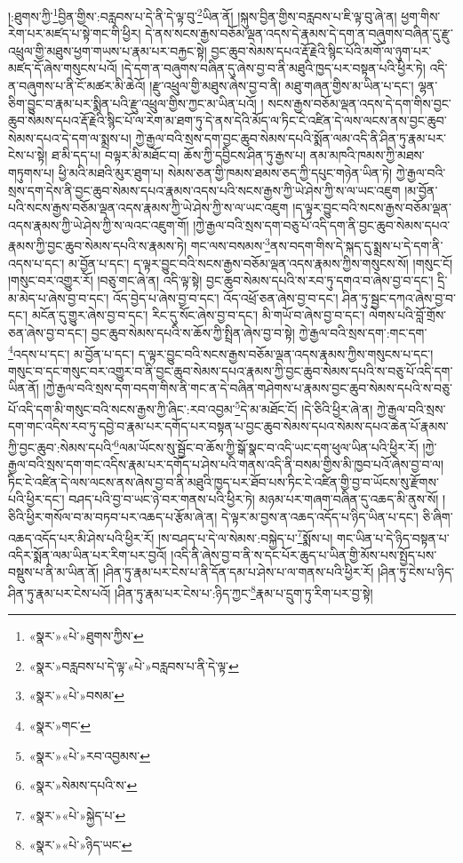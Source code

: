 །:ཐུགས་ཀྱི་\footnote{«སྣར་»«པེ་»ཐུགས་ཀྱིས་}བྱིན་གྱིས་:བརླབས་པ་དེ་ནི་དེ་ལྟ་བུ་\footnote{«སྣར་»བརླབས་པ་དེ་ལྟ་«པེ་»བརླབས་པ་ནི་དེ་ལྟ་}ཡིན་ནོ། །སྐུས་བྱིན་གྱིས་བརླབས་པ་ཇི་ལྟ་བུ་ཞེ་ན། ཕྱག་གིས་རེག་པར་མཛད་པ་སྟེ་གང་གི་ཕྱིར། དེ་ནས་སངས་རྒྱས་བཅོམ་ལྡན་འདས་དེ་རྣམས་དེ་དག་ན་བཞུགས་བཞིན་དུ་རྫུ་འཕྲུལ་གྱི་མཐུས་ཕྱག་གཡས་པ་རྣམ་པར་བརྐྱང་སྟེ། བྱང་ཆུབ་སེམས་དཔའ་རྡོ་རྗེའི་སྙིང་པོའི་མགོ་ལ་ཉུག་པར་མཛད་དོ་ཞེས་གསུངས་པའོ། །དེ་དག་ན་བཞུགས་བཞིན་དུ་ཞེས་བྱ་བ་ནི་མཐུའི་ཁྱད་པར་བསྟན་པའི་ཕྱིར་ཏེ། འདི་ན་བཞུགས་པ་ནི་ངོ་མཚར་མི་ཆེའོ། །རྫུ་འཕྲུལ་གྱི་མཐུས་ཞེས་བྱ་བ་ནི། མཐུ་གཞན་གྱིས་མ་ཡིན་པ་དང་། ལྷན་ཅིག་བྱུང་བ་རྣམ་པར་སྨིན་པའི་རྫུ་འཕྲུལ་གྱིས་ཀྱང་མ་ཡིན་པའོ། །
སངས་རྒྱས་བཅོམ་ལྡན་འདས་དེ་དག་གིས་བྱང་ཆུབ་སེམས་དཔའ་རྡོ་རྗེའི་སྙིང་པོ་ལ་རེག་མ་ཐག་ཏུ་དེ་ནས་དེའི་མོད་ལ་ཏིང་ངེ་འཛིན་དེ་ལས་ལངས་ནས་བྱང་ཆུབ་སེམས་དཔའ་དེ་དག་ལ་སྨྲས་པ། ཀྱེ་རྒྱལ་བའི་སྲས་དག་བྱང་ཆུབ་སེམས་དཔའི་སྨོན་ལམ་འདི་ནི་ཤིན་ཏུ་རྣམ་པར་ངེས་པ་སྟེ། ཐ་མི་དད་པ། བལྟར་མི་མཐོང་བ། ཆོས་ཀྱི་དབྱིངས་ཤིན་ཏུ་རྒྱས་པ། ནམ་མཁའི་ཁམས་ཀྱི་མཐས་གཏུགས་པ། ཕྱི་མའི་མཐའི་མུར་ཐུག་པ། སེམས་ཅན་གྱི་ཁམས་ཐམས་ཅད་ཀྱི་དཔུང་གཉེན་ཡིན་ཏེ། ཀྱེ་རྒྱལ་བའི་སྲས་དག་དེས་ནི་བྱང་ཆུབ་སེམས་དཔའ་རྣམས་འདས་པའི་སངས་རྒྱས་ཀྱི་ཡེ་ཤེས་ཀྱི་ས་ལ་ཡང་འཇུག །མ་བྱོན་པའི་སངས་རྒྱས་བཅོམ་ལྡན་འདས་རྣམས་ཀྱི་ཡེ་ཤེས་ཀྱི་ས་ལ་ཡང་འཇུག །ད་ལྟར་བྱུང་བའི་སངས་རྒྱས་བཅོམ་ལྡན་འདས་རྣམས་ཀྱི་ཡེ་ཤེས་ཀྱི་ས་ལའང་འཇུག་གོ། །ཀྱེ་རྒྱལ་བའི་སྲས་དག་བཅུ་པོ་འདི་དག་ནི་བྱང་ཆུབ་སེམས་དཔའ་རྣམས་ཀྱི་བྱང་ཆུབ་སེམས་དཔའི་ས་རྣམས་ཏེ། གང་ལས་བསམས་\footnote{«སྣར་»«པེ་»བསམ་}ནས་བདག་གིས་དེ་སྐད་དུ་སྨྲས་པ་དེ་དག་ནི་འདས་པ་དང་། མ་བྱོན་པ་དང་། ད་ལྟར་བྱུང་བའི་སངས་རྒྱས་བཅོམ་ལྡན་འདས་རྣམས་ཀྱིས་གསུངས་སོ། །གསུང་ངོ། །གསུང་བར་འགྱུར་རོ། །བཅུ་གང་ཞེ་ན། འདི་ལྟ་སྟེ། བྱང་ཆུབ་སེམས་དཔའི་ས་རབ་ཏུ་དགའ་བ་ཞེས་བྱ་བ་དང་། དྲི་མ་མེད་པ་ཞེས་བྱ་བ་དང་། འོད་བྱེད་པ་ཞེས་བྱ་བ་དང་། འོད་འཕྲོ་ཅན་ཞེས་བྱ་བ་དང་། ཤིན་ཏུ་སྦྱང་དཀའ་ཞེས་བྱ་བ་དང་། མངོན་དུ་གྱུར་ཞེས་བྱ་བ་དང་། རིང་དུ་སོང་ཞེས་བྱ་བ་དང་། མི་གཡོ་བ་ཞེས་བྱ་བ་དང་། ལེགས་པའི་བློ་གྲོས་ཅན་ཞེས་བྱ་བ་དང་། བྱང་ཆུབ་སེམས་དཔའི་ས་ཆོས་ཀྱི་སྤྲིན་ཞེས་བྱ་བ་སྟེ། ཀྱེ་རྒྱལ་བའི་སྲས་དག་:གང་དག་\footnote{«སྣར་»གང་}འདས་པ་དང་། མ་བྱོན་པ་དང་། ད་ལྟར་བྱུང་བའི་སངས་རྒྱས་བཅོམ་ལྡན་འདས་རྣམས་ཀྱིས་གསུངས་པ་དང་། གསུང་བ་དང་གསུང་བར་འགྱུར་བ་ནི་བྱང་ཆུབ་སེམས་དཔའ་རྣམས་ཀྱི་བྱང་ཆུབ་སེམས་དཔའི་ས་བཅུ་པོ་འདི་དག་ཡིན་ནོ། །ཀྱེ་རྒྱལ་བའི་སྲས་དག་བདག་གིས་ནི་གང་ན་དེ་བཞིན་གཤེགས་པ་རྣམས་བྱང་ཆུབ་སེམས་དཔའི་ས་བཅུ་པོ་འདི་དག་མི་གསུང་བའི་སངས་རྒྱས་ཀྱི་ཞིང་:རབ་འབྱམ་\footnote{«སྣར་»«པེ་»རབ་འབྱམས་}དེ་མ་མཐོང་ངོ། །དེ་ཅིའི་ཕྱིར་ཞེ་ན། ཀྱེ་རྒྱལ་བའི་སྲས་དག་གང་འདིས་རབ་ཏུ་དབྱེ་བ་རྣམ་པར་དགོད་པར་བསྟན་པ་བྱང་ཆུབ་སེམས་དཔའ་སེམས་དཔའ་ཆེན་པོ་རྣམས་ཀྱི་བྱང་ཆུབ་:སེམས་དཔའི་\footnote{«སྣར་»སེམས་དཔའི་ས་}ལམ་ཡོངས་སུ་སྦྱོང་བ་ཆོས་ཀྱི་སྒོ་སྣང་བ་འདི་ཡང་དག་ཕུལ་ཡིན་པའི་ཕྱིར་རོ། །ཀྱེ་རྒྱལ་བའི་སྲས་དག་གང་འདིས་རྣམ་པར་དགོད་པ་ཤེས་པའི་གནས་འདི་ནི་བསམ་གྱིས་མི་ཁྱབ་པའོ་ཞེས་བྱ་བ་ལ། ཏིང་ངེ་འཛིན་དེ་ལས་ལངས་ནས་ཞེས་བྱ་བ་ནི་མཐུའི་ཁྱད་པར་ཐོབ་པས་ཏིང་ངེ་འཛིན་གྱི་བྱ་བ་ཡོངས་སུ་རྫོགས་པའི་ཕྱིར་དང་། བཤད་པའི་བྱ་བ་ཡང་ཉེ་བར་གནས་པའི་ཕྱིར་ཏེ། མཉམ་པར་གཞག་བཞིན་དུ་འཆད་མི་ནུས་སོ། །ཅིའི་ཕྱིར་གསོལ་བ་མ་བཏབ་པར་འཆད་པ་རྩོམ་ཞེ་ན། དེ་ལྟར་མ་བྱས་ན་འཆད་འདོད་པ་ཉིད་ཡིན་པ་དང་། ཅི་ཞིག་འཆད་འདོད་པར་མི་ཤེས་པའི་ཕྱིར་རོ། །ས་བཤད་པ་དེ་ལ་སེམས་:བསྐྱེད་པ་\footnote{«སྣར་»«པེ་»སྐྱེད་པ་}སྨོས་པ། གང་ཡིན་པ་དེ་ཉིད་བསྟན་པ་འདིར་སྨོན་ལམ་ཡིན་པར་རིག་པར་བྱའོ། །འདི་ནི་ཞེས་བྱ་བ་ནི་ས་དང་པོར་ཆུད་པ་ཡིན་གྱི་མོས་པས་སྤྱོད་པས་བསྡུས་པ་ནི་མ་ཡིན་ནོ། །ཤིན་ཏུ་རྣམ་པར་ངེས་པ་ནི་དོན་དམ་པ་ཤེས་པ་ལ་གནས་པའི་ཕྱིར་རོ། །ཤིན་ཏུ་ངེས་པ་ཉིད་ཤིན་ཏུ་རྣམ་པར་ངེས་པའོ། །ཤིན་ཏུ་རྣམ་པར་ངེས་པ་:ཉིད་ཀྱང་\footnote{«སྣར་»«པེ་»ཉིད་ཡང་}རྣམ་པ་དྲུག་ཏུ་རིག་པར་བྱ་སྟེ། 